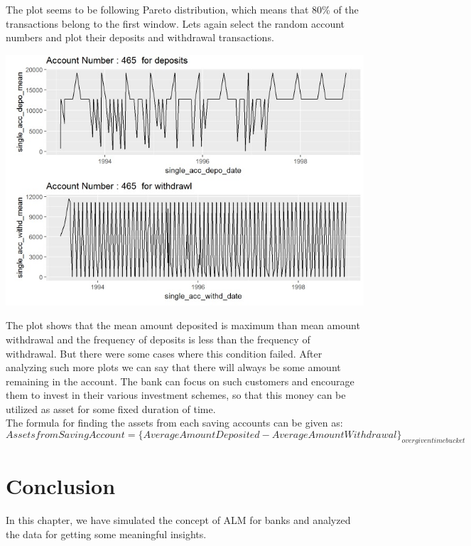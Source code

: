 The plot seems to be following Pareto distribution, which means that 80\% of the transactions belong to the first window.  Lets again select the random account numbers and plot their deposits and withdrawal transactions. 
				\begin{center}
				\includegraphics[width=\linewidth]{figures/deposit-withdrawal-plot.jpg}	
				\label{fig: The deposit and withdrawal plot for randomly chosen account number}
				\end{center}
The plot shows that the mean amount deposited is maximum than mean amount withdrawal and the frequency of deposits is less than the frequency of withdrawal. But there were some cases where this condition failed. After analyzing such more plots we can say that there will always be some amount remaining in the account. The bank can focus on such customers and encourage them to invest in their various investment schemes, so that this money can be utilized as asset for some fixed duration of time.\\ 
The formula for finding the assets from each saving accounts can be given as:
\begin{equation}
Assets from Saving Account = \{Average Amount Deposited - Average Amount Withdrawal\}_{over given time bucket}
\end{equation}

\section{Conclusion}

In this chapter, we have simulated the concept of ALM for banks and analyzed the data for getting some meaningful insights. 


